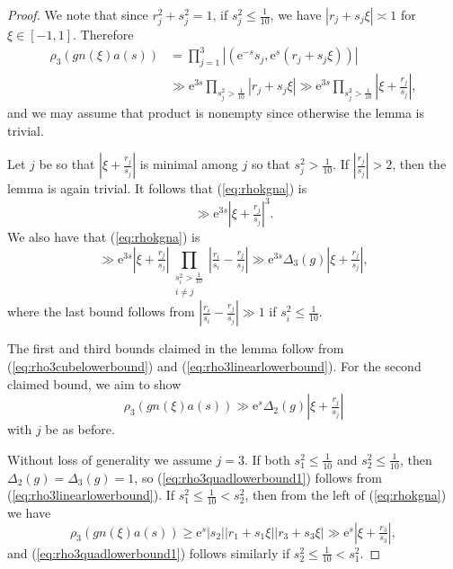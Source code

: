 \documentclass[12pt]{amsart}
\theoremstyle{definition}
\theoremstyle{remark}
\numberwithin{equation}{section}
\newcommand{\e}{\mathrm{e}}
\begin{document}
\begin{proof}
  We note that since $r_j^2 + s_j^2 = 1$, if $s_j^2 \leq \tfrac{1}{10}$, we have $|r_j + s_j \xi| \asymp 1$ for $\xi \in [-1,1]$.
  Therefore
  \begin{equation}
  \begin{split}
    \label{eq:rhokgna}
    \rho_3 (gn(\xi) a(s)) & = \prod_{j = 1}^3 |(\e^{-s} s_j, \e^s(r_j + s_j \xi))| \\
    &\gg \e^{3s} \prod_{s_j^2 > \tfrac{1}{10}} |r_j + s_j \xi| \gg \e^{3s} \prod_{s_j^2 > \tfrac{1}{10}} |\xi + \tfrac{r_j}{s_j}|,
  \end{split}
  \end{equation}
  and we may assume that product is nonempty since otherwise the lemma is trivial.

  Let $j$ be so that $|\xi + \tfrac{r_j}{s_j}|$ is minimal among $j$ so that $s_j^2 > \tfrac{1}{10}$.
  If $|\tfrac{r_j}{s_j}| > 2$, then the lemma is again trivial.
  It follows that (\ref{eq:rhokgna}) is
  \begin{equation}
    \label{eq:rho3cubelowerbound}
    \gg \e^{3s} |\xi + \tfrac{r_j}{s_j}|^3. 
  \end{equation}
  We also have that (\ref{eq:rhokgna}) is
  \begin{equation}
    \label{eq:rho3linearlowerbound}
    \gg \e^{3s} |\xi + \tfrac{r_j}{s_j}| \prod_{\substack{s_i^2 > \tfrac{1}{10} \\ i \neq j}} | \tfrac{r_i}{s_i} - \tfrac{r_j}{s_j} | \gg \e^{3s} \Delta_3(g) |\xi + \tfrac{r_j}{s_j}|, 
  \end{equation}
  where the last bound follows from $| \tfrac{r_i}{s_i} - \tfrac{r_j}{s_j} |\gg 1$ if $s_i^2 \leq \tfrac{1}{10}$.
  
  The first and third bounds claimed in the lemma follow from (\ref{eq:rho3cubelowerbound}) and (\ref{eq:rho3linearlowerbound}).
  For the second claimed bound, we aim to show
  \begin{equation}
    \label{eq:rho3quadlowerbound1}
    \rho_3(gn(\xi)a(s)) \gg \e^s \Delta_2(g) |\xi + \tfrac{r_j}{s_j}|
  \end{equation}
  with $j$ be as before.  

  Without loss of generality we assume $j = 3$.
  If both $s_1^2 \leq \tfrac{1}{10}$ and $s_2^2 \leq \tfrac{1}{10}$, then $\Delta_2(g) = \Delta_3(g) = 1$, so (\ref{eq:rho3quadlowerbound1}) follows from (\ref{eq:rho3linearlowerbound}).
  If $s_1^2 \leq \tfrac{1}{10} < s_2^2$, then from the left of (\ref{eq:rhokgna}) we have
  \begin{equation}
    \label{eq:rho3quadlowerbound4}
    \rho_3(gn(\xi)a(s)) \geq \e^s |s_2| |r_1 + s_1 \xi| |r_3 + s_3 \xi| \gg \e^s |\xi + \tfrac{r_3}{s_3}|,
  \end{equation}
  and (\ref{eq:rho3quadlowerbound1}) follows similarly if $s_2^2 \leq \tfrac{1}{10} < s_1^2$.


\end{proof}
\end{document}
